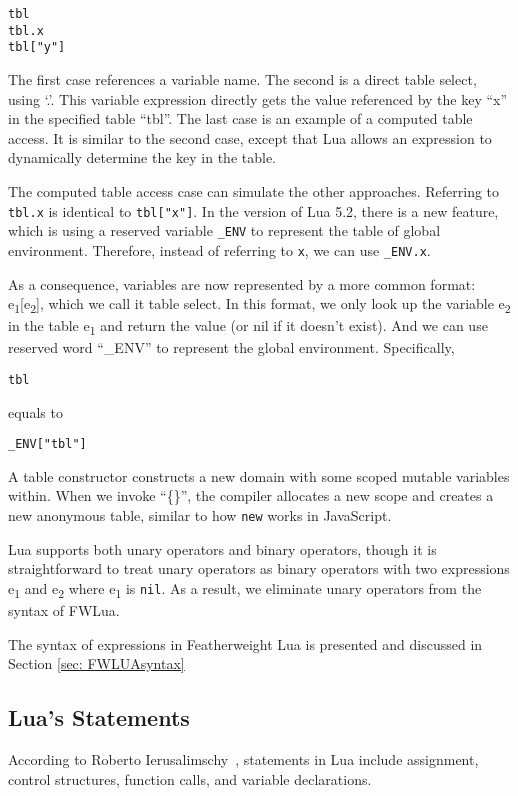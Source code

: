 \begin{verbatim}
tbl
tbl.x
tbl["y"]
\end{verbatim}

The first case references a variable name.
The second is a direct table select, using `.'.
This variable expression directly gets the value referenced by the key ``x'' in the specified table ``tbl''.
The last case is an example of a computed table access.
It is similar to the second case, except that Lua allows an expression to dynamically determine the key in the table.

The computed table access case can simulate the other approaches.
Referring to {\tt tbl.x} is identical to {\tt tbl["x"]}.
In the version of Lua 5.2, there is a new feature, which is using a reserved variable {\tt \_ENV} to represent the table of global environment.
Therefore, instead of referring to {\tt x}, we can use {\tt \_ENV.x}.

As a consequence, variables are now represented by a more common format: e\textsubscript{1}[e\textsubscript{2}], which we call it table select. In this format, we only look up the variable e\textsubscript{2} in the table e\textsubscript{1} and return the value (or nil if it doesn't exist). And we can use reserved word ``\_ENV'' to represent the global environment. Specifically,

\begin{verbatim}
tbl
\end{verbatim}
equals to
\begin{verbatim}
_ENV["tbl"]
\end{verbatim}

A table constructor
constructs a new domain with some scoped mutable variables within.
When we invoke ``\{\}'', the compiler allocates a new scope
and creates a new anonymous table, similar to how {\tt new} works in JavaScript.

Lua supports both
unary operators and binary operators, though it is straightforward to treat unary operators as binary operators
with two expressions e\textsubscript{1} and e\textsubscript{2} where e\textsubscript{1} is {\tt nil}.
As a result, we eliminate unary operators from the syntax of FWLua.

The syntax of expressions in Featherweight Lua is presented and discussed in Section \ref{sec: FWLUAsyntax}

\subsection{Lua's Statements}
According to Roberto Ierusalimschy~\cite{PIL},
statements in Lua include assignment, control structures, function calls, and variable declarations.

